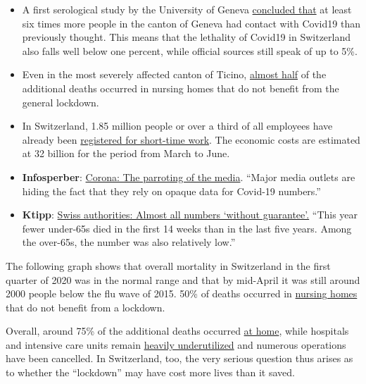 \begin{itemize}
\tightlist
\item
  A first serological study by the University of Geneva
  \href{https://www.hug-ge.ch/medias/communique-presse/seroprevalence-covid-19-premiere-estimation}{concluded
  that} at least six times more people in the canton of Geneva had
  contact with Covid19 than previously thought. This means that the
  lethality of Covid19 in Switzerland also falls well below one percent,
  while official sources still speak of up to 5\%.
\item
  Even in the most severely affected canton of Ticino,
  \href{https://www.bluewin.ch/de/news/schweiz/sp-chef-levrat-will-die-reichen-schropfen-383977.html}{almost
  half} of the additional deaths occurred in nursing homes that do not
  benefit from the general lockdown.
\item
  In Switzerland, 1.85 million people or over a third of all employees
  have already been
  \href{https://www.bluewin.ch/de/news/schweiz/sp-chef-levrat-will-die-reichen-schropfen-383977.html}{registered
  for short-time work}. The economic costs are estimated at 32 billion
  for the period from March to June.
\item
  \textbf{Infosperber}:
  \href{https://www.infosperber.ch/Artikel/Medien/Corona-NZZ-deckt-das-Nachplappern-anderer-Medien-auf}{Corona:
  The parroting of the media}. ``Major media outlets are hiding the fact
  that they rely on opaque data for Covid-19 numbers.''
\item
  \textbf{Ktipp}:
  \href{https://www.ktipp.ch/artikel/artikeldetail/bund-fast-alle-zahlen-ohne-gewaehr/}{Swiss
  authorities: Almost all numbers `without guarantee'.} ``This year
  fewer under-65s died in the first 14 weeks than in the last five
  years. Among the over-65s, the number was also relatively low.''
\end{itemize}

The following graph shows that overall mortality in Switzerland in the
first quarter of 2020 was in the normal range and that by mid-April it
was still around 2000 people below the flu wave of 2015. 50\% of deaths
occurred in
\href{https://www.nzz.ch/zuerich/coronavirus-zuerich-aendert-nun-das-testregime-in-heimenauch-viele-aeltere-covid-19-infizierte-entwickeln-keine-symptome-zuerich-aendert-nun-das-testregime-in-heimen-ld.1552089}{nursing
homes} that do not benefit from a lockdown.

Overall, around 75\% of the additional deaths occurred
\href{https://www.tagesspiegel.de/wissen/woran-sterben-corona-patienten-wirklich-ein-schweizer-forscher-macht-hoffnung-im-kampf-gegen-covid-19/25750666.html}{at
home}, while hospitals and intensive care units remain
\href{https://swprs.files.wordpress.com/2020/04/intensivbettenbelegung-schweiz-2020-04-14.png}{heavily
underutilized} and numerous operations have been cancelled. In
Switzerland, too, the very serious question thus arises as to whether
the ``lockdown'' may have cost more lives than it saved.

